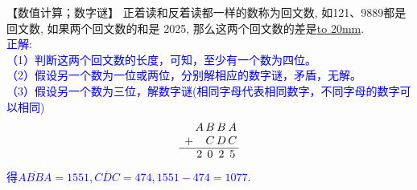 \item {
    【数值计算；数字谜】
    正着读和反着读都一样的数称为回文数, 如121、9889都是回文数, 如果两个回文数的和是 2025, 那么这两个回文数的差是\underline{\hbox to 20mm{}}.
    \ifshowSolution
        \\\fangsong{}\textcolor{blue}{
            正解: \\
            （1）判断这两个回文数的长度，可知，至少有一个数为四位。\\
            （2）假设另一个数为一位或两位，分别解相应的数字谜，矛盾，无解。\\
            （3）假设另一个数为三位，解数字谜(相同字母代表相同数字，不同字母的数字可以相同)
            \[
            \begin{array}{l@{\,} c@{\,} c@{\,} c@{\,} c@{\,}}
            & A & B & B & A \\
            + && C  & D & C \\
            \cline{1-5}
            & 2 & 0 & 2 & 5 \\
            \end{array}
            \]
            得$\overline{ABBA}=1551, \overline{CDC}=474, 1551-474=1077.$\\
        }
    \else
        \vspace{1cm}
    \fi
}


